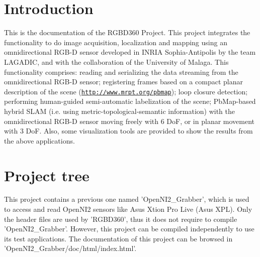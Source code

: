 \hypertarget{index_intro_sec}{}\section{Introduction}\label{index_intro_sec}
This is the documentation of the R\-G\-B\-D360 Project. This project integrates the functionality to do image acquisition, localization and mapping using an omnidirectional R\-G\-B-\/\-D sensor developed in I\-N\-R\-I\-A Sophia-\/\-Antipolis by the team L\-A\-G\-A\-D\-I\-C, and with the collaboration of the University of Malaga. This functionality comprises\-: reading and serializing the data streaming from the omnidirectional R\-G\-B-\/\-D sensor; registering frames based on a compact planar description of the scene (\href{http://www.mrpt.org/pbmap}{\tt http\-://www.\-mrpt.\-org/pbmap}); loop closure detection; performing human-\/guided semi-\/automatic labelization of the scene; Pb\-Map-\/based hybrid S\-L\-A\-M (i.\-e. using metric-\/topological-\/semantic information) with the omnidirectional R\-G\-B-\/\-D sensor moving freely with 6 Do\-F, or in planar movement with 3 Do\-F. Also, some visualization tools are provided to show the results from the above applications.

  \par
\hypertarget{index_project_sec}{}\section{Project tree}\label{index_project_sec}
This project contains a previous one named 'Open\-N\-I2\-\_\-\-Grabber', which is used to access and read Open\-N\-I2 sensors like Asus Xtion Pro Live (Asus X\-P\-L). Only the header files are used by 'R\-G\-B\-D360', thus it does not require to compile 'Open\-N\-I2\-\_\-\-Grabber'. However, this project can be compiled independently to use its test applications. The documentation of this project can be browsed in 'Open\-N\-I2\-\_\-\-Grabber/doc/html/index.\-html'. \par


